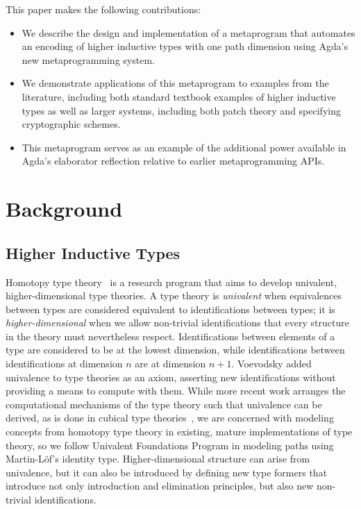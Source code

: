 \documentclass[runningheads]{llncs}
\begin{document}
This paper makes the following contributions:
\begin{itemize}
\item We describe the design and implementation of a metaprogram that automates an encoding of higher inductive types with one path dimension using Agda's new metaprogramming system.
\item We demonstrate applications of this metaprogram to examples from the literature, including both standard textbook examples of higher inductive types as well as larger systems, including both patch theory and specifying cryptographic schemes.
\item This metaprogram serves as an example of the additional power available in Agda's elaborator reflection relative to earlier metaprogramming APIs.
\end{itemize}


\section{Background}
\label{sec:sec2}

\subsection{Higher Inductive Types}
\label{sec:sec2.1}

Homotopy type theory~\cite{HoTT-2013} is a research program that aims to develop univalent, higher-dimensional type theories.
A type theory is \emph{univalent} when equivalences between types are considered equivalent to identifications between types; it is \emph{higher-dimensional} when we allow non-trivial identifications that every structure in the theory must nevertheless respect.
Identifications between elements of a type are considered to be at the lowest dimension, while identifications between identifications at dimension $n$ are at dimension $n+1$.
Voevodsky added univalence  to type theories as an axiom, asserting new identifications without providing a means to compute with them.
While more recent work arranges the computational mechanisms of the type theory such that univalence can be derived, as is done in cubical type theories~\cite{cohen}\cite{Angiuli-2017}, we are concerned with modeling concepts from homotopy type theory in existing, mature implementations of type theory, so we follow Univalent Foundations Program \cite{HoTT-2013} in modeling paths using Martin-Löf's identity type.
Higher-dimensional structure can arise from univalence, but it can also be introduced by defining new type formers that introduce not only introduction and elimination principles, but also new non-trivial identifications.
\end{document}
